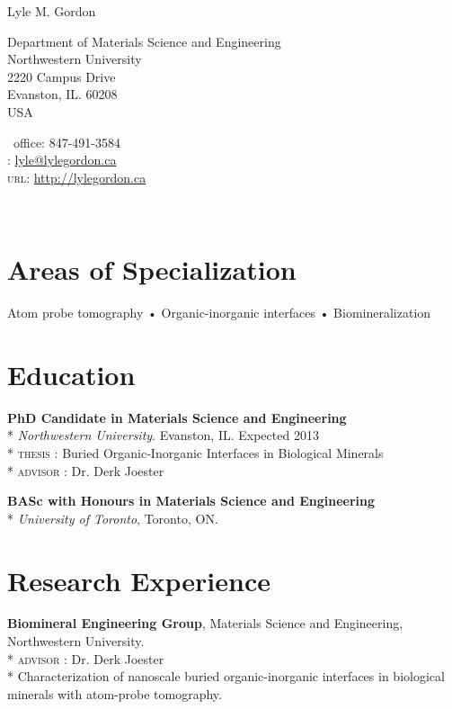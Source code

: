 \setlength\parindent{0cm}
{\LARGE Lyle M. Gordon}\\[0.5cm]

\noindent\begin{minipage}[t]{0.6\textwidth}
Department of Materials Science and Engineering\\
Northwestern University\\
2220 Campus Drive\\
Evanston, IL. 60208\\
USA
\end{minipage}%
\hfill
\begin{minipage}[t]{0.4\textwidth}
\Telefon \ {\small{office}}: 847-491-3584\\
\Letter: \href{mailto:lyle@lylegordon.ca}{lyle@lylegordon.ca}\\
\textsc{url}: \href{http://lylegordon.ca}{http://lylegordon.ca}
\end{minipage}\\[2.5mm]


\section*{\large{Areas of Specialization}}
Atom probe tomography • Organic-inorganic interfaces • Biomineralization

\section*{Education}
\textbf{PhD Candidate in Materials Science and Engineering}\\*
\begingroup\setlength{\parskip}{0.2cm}
\emph{Northwestern University}. Evanston, IL. Expected 2013\\*
\textsc{thesis} : Buried Organic-Inorganic Interfaces in Biological Minerals\\*
\textsc{advisor} : Dr. Derk Joester

\textbf{BASc with Honours in Materials Science and Engineering}\\*
\emph{University of Toronto}, Toronto, ON.
\endgroup

\section*{Research Experience}
\textbf{Biomineral Engineering Group}, Materials Science and Engineering, Northwestern University.\\*
\begingroup\setlength{\parskip}{0.2cm}
\textsc{advisor} : Dr. Derk Joester\\*
Characterization of nanoscale buried organic-inorganic interfaces in biological minerals with atom-probe tomography.

